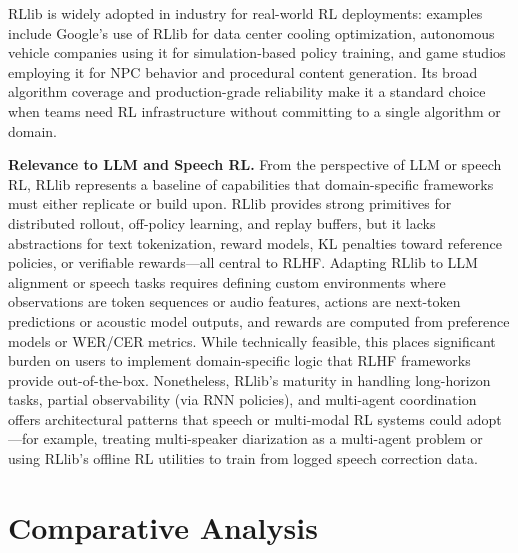 \documentclass[conference]{IEEEtran}
\begin{document}
RLlib is widely adopted in industry for real-world RL deployments: examples include Google's use of RLlib for data center cooling optimization, autonomous vehicle companies using it for simulation-based policy training, and game studios employing it for NPC behavior and procedural content generation. Its broad algorithm coverage and production-grade reliability make it a standard choice when teams need RL infrastructure without committing to a single algorithm or domain.

\textbf{Relevance to LLM and Speech RL.} From the perspective of LLM or speech RL, RLlib represents a baseline of capabilities that domain-specific frameworks must either replicate or build upon. RLlib provides strong primitives for distributed rollout, off-policy learning, and replay buffers, but it lacks abstractions for text tokenization, reward models, KL penalties toward reference policies, or verifiable rewards—all central to RLHF. Adapting RLlib to LLM alignment or speech tasks requires defining custom environments where observations are token sequences or audio features, actions are next-token predictions or acoustic model outputs, and rewards are computed from preference models or WER/CER metrics. While technically feasible, this places significant burden on users to implement domain-specific logic that RLHF frameworks provide out-of-the-box. Nonetheless, RLlib's maturity in handling long-horizon tasks, partial observability (via RNN policies), and multi-agent coordination offers architectural patterns that speech or multi-modal RL systems could adopt—for example, treating multi-speaker diarization as a multi-agent problem or using RLlib's offline RL utilities to train from logged speech correction data.


\section{Comparative Analysis}
\label{sec:comparison}
\end{document}
